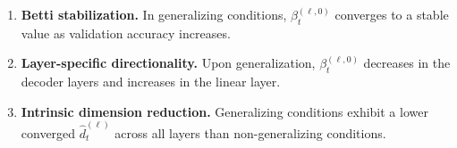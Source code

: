 \begin{enumerate}[label=\textbf{(H\arabic*)}]
    \item \textbf{Betti stabilization.} In generalizing conditions,
          $\beta^{(\ell,0)}_t$ converges to a stable value as validation accuracy increases.

    \item \textbf{Layer-specific directionality.} Upon generalization,
          $\beta^{(\ell,0)}_t$ decreases in the decoder layers and
          increases in the linear layer.

    \item \textbf{Intrinsic dimension reduction.} Generalizing conditions
          exhibit a lower converged $\hat{d}^{(\ell)}_t$ across all
          layers than non-generalizing conditions.
\end{enumerate}

